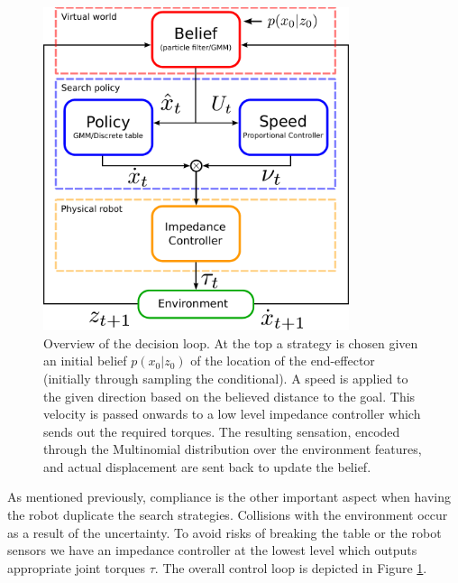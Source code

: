 \begin{figure}
\centering
  \includegraphics[width=0.8\textwidth]{./ch3-Search/Figures/Figure5}
  \caption{Overview of the decision loop. At the top a strategy is chosen given an initial belief
$p(x_{0}|z_{0})$ of the location of the end-effector (initially through sampling the conditional). 
A speed is applied to the given direction based on the believed distance
to the goal. This velocity is passed onwards to
a low level impedance controller which sends out the required torques. The
resulting sensation, encoded through the Multinomial distribution over
  the environment features, and actual displacement are sent back to update the
belief.}
  \label{fig:flow_chart}
\end{figure}

%
%
As mentioned previously, compliance is the other important aspect when having the robot duplicate the search strategies. 
Collisions with the environment occur as a result of the uncertainty. To avoid risks of breaking the table or the robot sensors we have an impedance controller
at the lowest level which outputs appropriate joint torques $\tau$. The overall control loop is depicted in Figure \ref{fig:flow_chart}.




